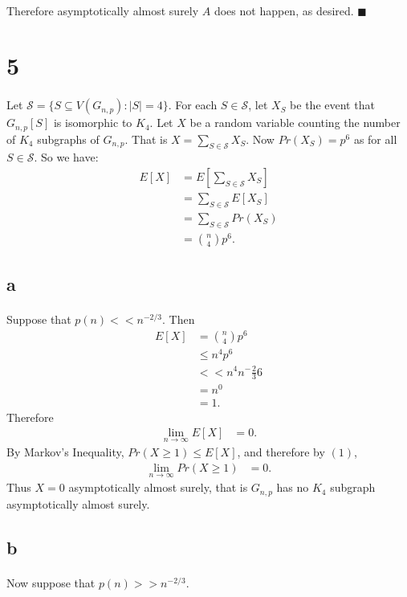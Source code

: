 \documentclass[letterpaper,12pt,oneside,onecolumn]{report}
\begin{document}
\paragraph{}
Therefore asymptotically almost surely $A$ does not happen, as desired. $\blacksquare$
\section*{5}
\paragraph{}
Let $\mathcal{S} = \{S \subseteq V(G_{n,p}) : |S| = 4\}$. For each $S \in \mathcal{S}$, let $X_S$ be the event that $G_{n,p}[S]$ is isomorphic to $K_4$. Let $X$ be a random variable counting the number of $K_4$ subgraphs of $G_{n,p}$. That is $X = \sum_{S \in \mathcal{S}} X_S$. Now $Pr(X_S) = p^6$ as for all $S \in \mathcal{S}$. So we have:
\begin{align*} 
E[X] &= E[\sum_{S \in \mathcal{S}} X_S] \\
&= \sum_{S \in \mathcal{S}} E[X_S] \\
&= \sum_{S \in \mathcal{S}} Pr(X_S) \\
&= {n \choose 4} p^6.
\end{align*}
\subsection*{a}
\paragraph{}
Suppose that $p(n) << n^{-2/3}$. Then 
\begin{align*}
E[X] &= {n \choose 4} p^6 \\
&\leq n^4 p^6 \\
&<< n^4 n^-\frac{2}{3}6 \\
&= n^0 \\
&= 1.
\end{align*}
Therefore 
\begin{align}
\lim_{n\to \infty}E[X] &= 0.
\end{align}
By Markov's Inequality, $Pr(X \geq 1) \leq E[X]$, and therefore by $(1)$, 
\begin{align*}
\lim_{n \to \infty}Pr(X \geq 1) &= 0.
\end{align*}
Thus $X = 0$ asymptotically almost surely, that is $G_{n,p}$ has no $K_4$ subgraph asymptotically almost surely.
\subsection*{b}
\paragraph{}
Now suppose that $p(n) >> n^{-2/3}$.
\end{document}

